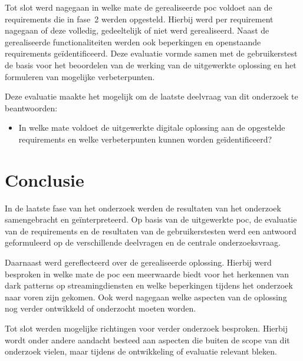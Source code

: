 Tot slot werd nagegaan in welke mate de gerealiseerde \acrshort{poc} voldoet aan de requirements die in fase~2 werden opgesteld. Hierbij werd per requirement nagegaan of deze volledig, gedeeltelijk of niet werd gerealiseerd. Naast de gerealiseerde functionaliteiten werden ook beperkingen en openstaande requirements geïdentificeerd. Deze evaluatie vormde samen met de gebruikerstest de basis voor het beoordelen van de werking van de uitgewerkte oplossing en het formuleren van mogelijke verbeterpunten.

\vspace{1em}

Deze evaluatie maakte het mogelijk om de laatste deelvraag van dit onderzoek te beantwoorden:

\begin{itemize}
    \item In welke mate voldoet de uitgewerkte digitale oplossing aan de opgestelde requirements en welke verbeterpunten kunnen worden geïdentificeerd?
\end{itemize}

\vspace{1em}

\section{Conclusie}
\label{sec:conclusie}

\vspace{1em}

In de laatste fase van het onderzoek werden de resultaten van het onderzoek samengebracht en geïnterpreteerd. Op basis van de uitgewerkte \acrshort{poc}, de evaluatie van de requirements en de resultaten van de gebruikerstesten werd een antwoord geformuleerd op de verschillende deelvragen en de centrale onderzoeksvraag.

\vspace{1em}

Daarnaast werd gereflecteerd over de gerealiseerde oplossing. Hierbij werd besproken in welke mate de \acrshort{poc} een meerwaarde biedt voor het herkennen van dark patterns op streamingdiensten en welke beperkingen tijdens het onderzoek naar voren zijn gekomen. Ook werd nagegaan welke aspecten van de oplossing nog verder ontwikkeld of onderzocht moeten worden.

\vspace{1em}

Tot slot werden mogelijke richtingen voor verder onderzoek besproken. Hierbij wordt onder andere aandacht besteed aan aspecten die buiten de scope van dit onderzoek vielen, maar tijdens de ontwikkeling of evaluatie relevant bleken.
